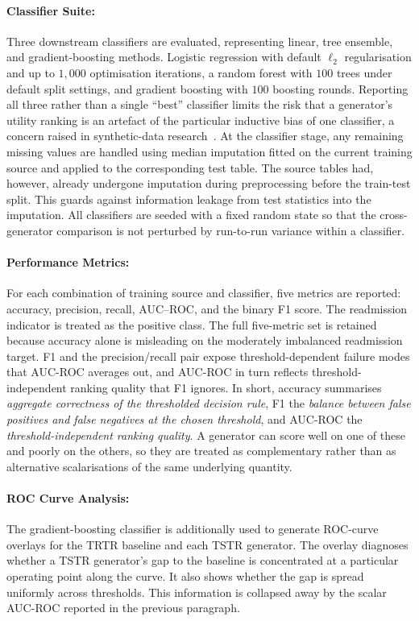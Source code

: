 \paragraph{Classifier Suite:}
\label{sec:eval:utility:predictive:classifiers}
Three downstream classifiers are evaluated, representing linear,
tree ensemble, and gradient-boosting methods.
Logistic regression with default $\ell_2$ regularisation and up to
$1{,}000$ optimisation iterations, a random forest with $100$ trees
under default split settings, and gradient boosting with $100$ boosting
rounds. Reporting all three rather than a single ``best'' classifier
limits the risk that a generator's utility ranking is an artefact of
the particular inductive bias of one classifier, a concern raised in
synthetic-data research~\cite{Murtaza2023}. At the classifier stage, 
any remaining missing values are handled using
median imputation fitted on the current training source and applied to the
corresponding test table. The source tables had, however, already undergone
imputation during preprocessing before the train-test split. 
This guards against information leakage
from test statistics into the imputation. All classifiers are seeded
with a fixed random state so that the cross-generator comparison is
not perturbed by run-to-run variance within a classifier.

\paragraph{Performance Metrics:}
\label{sec:eval:utility:predictive:metrics}
For each combination of training source and classifier, five metrics are
reported: accuracy, precision, recall, AUC--ROC, and the binary F1 score.
The readmission indicator is treated as the positive class.
The full five-metric set is retained because accuracy alone is
misleading on the moderately imbalanced readmission target. F1 and
the precision/recall pair expose threshold-dependent failure modes
that AUC-ROC averages out, and AUC-ROC in turn reflects
threshold-independent ranking quality that F1 ignores. In short,
accuracy summarises \emph{aggregate correctness of the thresholded
decision rule}, F1 the \emph{balance between false positives and false negatives at
the chosen threshold}, and AUC-ROC the \emph{threshold-independent
ranking quality}. A generator can score well on one of these and
poorly on the others, so they are treated as complementary rather
than as alternative scalarisations of the same underlying quantity.

\paragraph{ROC Curve Analysis:}
\label{sec:eval:utility:predictive:roc}
The gradient-boosting classifier is additionally used to generate
ROC-curve overlays for the TRTR baseline and each TSTR generator.
The overlay diagnoses whether a TSTR generator's gap to the baseline 
is concentrated at a particular operating point along the curve. 
It also shows whether the gap is spread uniformly across thresholds. 
This information is collapsed away by the scalar AUC-ROC reported in 
the previous paragraph.

